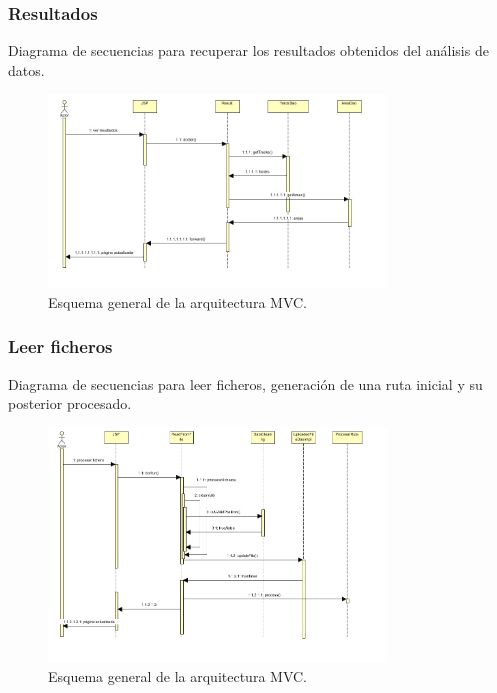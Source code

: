 \subsubsection{Resultados}
Diagrama de secuencias para recuperar los resultados obtenidos del análisis de datos.
\begin{figure}[!htbp]
  \centering
    \includegraphics[width=0.8\textwidth]{../img/diagramas/secuencias/14.jpg}
  \caption{Esquema general de la arquitectura MVC.}
  \label{mvc}
\end{figure}

\subsubsection{Leer ficheros}
Diagrama de secuencias para leer ficheros, generación de una ruta inicial y su posterior procesado.
\begin{figure}[!htbp]
  \centering
    \includegraphics[width=0.8\textwidth]{../img/diagramas/secuencias/7.jpg}
  \caption{Esquema general de la arquitectura MVC.}
  \label{mvc}
\end{figure}


